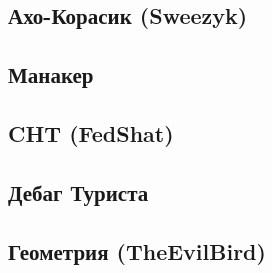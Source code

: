 \documentclass[a4paper]{article}
\begin{document}
\begin{multicols*}{2}
        \subsection{Ахо-Корасик (Sweezyk)}
            
            
        \subsection{Манакер}
            
            
        \subsection{CHT (FedShat)}
            
        
        \subsection{Дебаг Туриста}
            
        
        \subsection{Геометрия (TheEvilBird)}
            
    
    
\end{multicols*}
\end{document}
